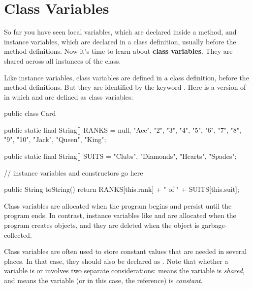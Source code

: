 \section{Class Variables}
\label{classvar}


So far you have seen local variables, which are declared inside a method, and instance variables, which are declared in a class definition, usually before the method definitions.
Now it's time to learn about {\bf class variables}.
They are shared across all instances of the class.



Like instance variables, class variables are defined in a class definition, before the method definitions.
But they are identified by the keyword .
Here is a version of  in which  and  are defined as class variables:

\begin{code}
public class Card {

    public static final String[] RANKS = {
        null, "Ace", "2", "3", "4", "5", "6", "7",
        "8", "9", "10", "Jack", "Queen", "King"};

    public static final String[] SUITS = {
        "Clubs", "Diamonds", "Hearts", "Spades"};

    // instance variables and constructors go here

    public String toString() {
        return RANKS[this.rank] + " of " + SUITS[this.suit];
    }
}
\end{code}


Class variables are allocated when the program begins and persist until the program ends.
In contrast, instance variables like  and  are allocated when the program creates  objects, and they are deleted when the object is garbage-collected.



Class variables are often used to store constant values that are needed in several places.
In that case, they should also be declared as .
Note that whether a variable is  or  involves two separate considerations:
 means the variable is {\em shared}, and  means the variable (or in this case, the reference) is {\em constant}.

